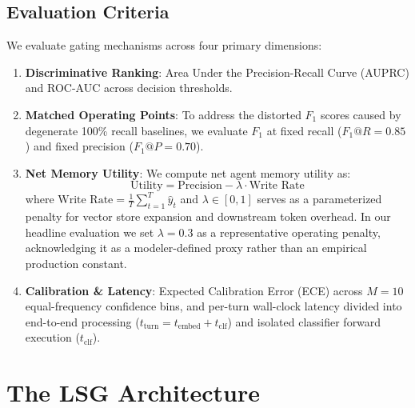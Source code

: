 \documentclass[journal]{IEEEtran}
\begin{document}
\subsection{Evaluation Criteria}
We evaluate gating mechanisms across four primary dimensions:
\begin{enumerate}
    \item \textbf{Discriminative Ranking}: Area Under the Precision-Recall Curve (AUPRC) and ROC-AUC across decision thresholds.
    \item \textbf{Matched Operating Points}: To address the distorted $F_1$ scores caused by degenerate 100\% recall baselines, we evaluate $F_1$ at fixed recall ($F_1@R=0.85$) and fixed precision ($F_1@P=0.70$).
    \item \textbf{Net Memory Utility}: We compute net agent memory utility as:
    \begin{equation}
        \text{Utility} = \text{Precision} - \lambda \cdot \text{Write Rate}
    \end{equation}
    where $\text{Write Rate} = \frac{1}{T}\sum_{t=1}^T \hat{y}_t$ and $\lambda \in [0, 1]$ serves as a parameterized penalty for vector store expansion and downstream token overhead. In our headline evaluation we set $\lambda = 0.3$ as a representative operating penalty, acknowledging it as a modeler-defined proxy rather than an empirical production constant.
    \item \textbf{Calibration \& Latency}: Expected Calibration Error (ECE) across $M=10$ equal-frequency confidence bins, and per-turn wall-clock latency divided into end-to-end processing ($t_{\text{turn}} = t_{\text{embed}} + t_{\text{clf}}$) and isolated classifier forward execution ($t_{\text{clf}}$).
\end{enumerate}

\section{The LSG Architecture}
\end{document}
